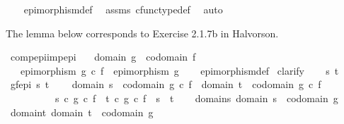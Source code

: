 \begin{isabellebody}
%
\isadelimproof
\ \ %
\endisadelimproof
%
\isatagproof
{}\isamarkupfalse%
\ epimorphism{\isacharunderscore}{\kern0pt}def{}\ \isamarkupfalse%
\ assms\ cfunc{\isacharunderscore}{\kern0pt}type{\isacharunderscore}{\kern0pt}def\ \isamarkupfalse%
\ auto%
\endisatagproof
{\isafoldproof}%
%
\isadelimproof
%
\endisadelimproof
%
\begin{isamarkuptext}%
The lemma below corresponds to Exercise 2.1.7b in Halvorson.%
\end{isamarkuptext}\isamarkuptrue%
\isamarkupfalse%
\ comp{\isacharunderscore}{\kern0pt}epi{\isacharunderscore}{\kern0pt}imp{\isacharunderscore}{\kern0pt}epi{\isacharcolon}{\kern0pt}\isanewline
\ \ \ {\isachardoublequoteopen}domain\ g\ {\isacharequal}{\kern0pt}\ codomain\ f{\isachardoublequoteclose}\isanewline
\ \ \ {\isachardoublequoteopen}epimorphism\ {\isacharparenleft}{\kern0pt}g\ {\isasymcirc}\isactrlsub c\ f{\isacharparenright}{\kern0pt}\ {\isasymLongrightarrow}\ epimorphism\ g{\isachardoublequoteclose}\isanewline
%
\isadelimproof
\ \ %
\endisadelimproof
%
\isatagproof
{}\isamarkupfalse%
\ epimorphism{\isacharunderscore}{\kern0pt}def\isanewline
{}\isamarkupfalse%
\ clarify\isanewline
\ \ \isamarkupfalse%
\ s\ t\isanewline
\ \ \isamarkupfalse%
\ gf{\isacharunderscore}{\kern0pt}epi{\isacharcolon}{\kern0pt}\ {\isachardoublequoteopen}{\isasymforall}s{\isachardot}{\kern0pt}\ {\isasymforall}t{\isachardot}{\kern0pt}\isanewline
\ \ \ \ domain\ s\ {\isacharequal}{\kern0pt}\ codomain\ {\isacharparenleft}{\kern0pt}g\ {\isasymcirc}\isactrlsub c\ f{\isacharparenright}{\kern0pt}\ {\isasymand}\ domain\ t\ {\isacharequal}{\kern0pt}\ codomain\ {\isacharparenleft}{\kern0pt}g\ {\isasymcirc}\isactrlsub c\ f{\isacharparenright}{\kern0pt}\ {\isasymlongrightarrow}\isanewline
\ \ \ \ \ \ \ \ \ \ s\ {\isasymcirc}\isactrlsub c\ g\ {\isasymcirc}\isactrlsub c\ f\ {\isacharequal}{\kern0pt}\ t\ {\isasymcirc}\isactrlsub c\ g\ {\isasymcirc}\isactrlsub c\ f\ {\isasymlongrightarrow}\ s\ {\isacharequal}{\kern0pt}\ t{\isachardoublequoteclose}\isanewline
\ \ \isamarkupfalse%
\ domain{\isacharunderscore}{\kern0pt}s{\isacharcolon}{\kern0pt}\ {\isachardoublequoteopen}domain\ s\ {\isacharequal}{\kern0pt}\ codomain\ g{\isachardoublequoteclose}\isanewline
\ \ \isamarkupfalse%
\ domain{\isacharunderscore}{\kern0pt}t{\isacharcolon}{\kern0pt}\ {\isachardoublequoteopen}domain\ t\ {\isacharequal}{\kern0pt}\ codomain\ g{\isachardoublequoteclose}\isanewline

\end{isabellebody}

